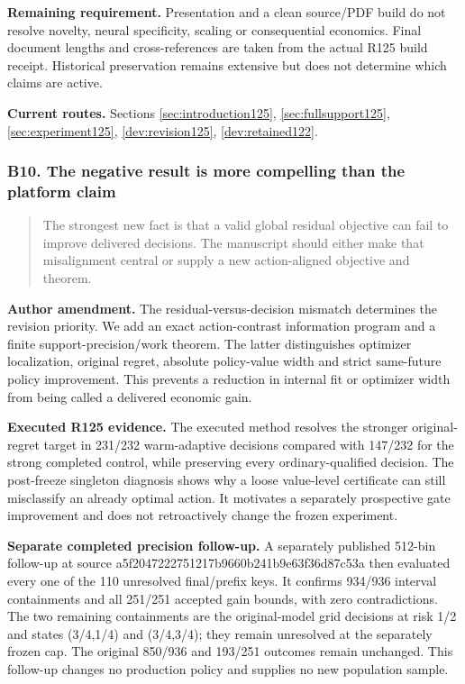\noindent\textbf{Remaining requirement.} Presentation and a clean source/PDF build do not resolve novelty, neural specificity, scaling or consequential economics. Final document lengths and cross-references are taken from the actual R125 build receipt. Historical preservation remains extensive but does not determine which claims are active.

\noindent\textbf{Current routes.} Sections \ref{sec:introduction125}, \ref{sec:fullsupport125}, \ref{sec:experiment125}, \ref{dev:revision125}, \ref{dev:retained122}.

\subsubsection{B10. The negative result is more compelling than the platform claim}

\begin{quote}\small
The strongest new fact is that a valid global residual objective can fail to improve delivered decisions. The manuscript should either make that misalignment central or supply a new action-aligned objective and theorem.
\end{quote}

\noindent\textbf{Author amendment.} The residual-versus-decision mismatch determines the revision priority. We add an exact action-contrast information program and a finite support-precision/work theorem. The latter distinguishes optimizer localization, original regret, absolute policy-value width and strict same-future policy improvement. This prevents a reduction in internal fit or optimizer width from being called a delivered economic gain.

\noindent\textbf{Executed R125 evidence.} The executed method resolves the stronger original-regret target in 231/232 warm-adaptive decisions compared with 147/232 for the strong completed control, while preserving every ordinary-qualified decision. The post-freeze singleton diagnosis shows why a loose value-level certificate can still misclassify an already optimal action. It motivates a separately prospective gate improvement and does not retroactively change the frozen experiment.

\noindent\textbf{Separate completed precision follow-up.} A separately published 512-bin follow-up at source a5f2047222751217b9660b241b9e63f36d87c53a then evaluated every one of the 110 unresolved final/prefix keys. It confirms 934/936 interval containments and all 251/251 accepted gain bounds, with zero contradictions. The two remaining containments are the original-model grid decisions at risk 1/2 and states (3/4,1/4) and (3/4,3/4); they remain unresolved at the separately frozen cap. The original 850/936 and 193/251 outcomes remain unchanged. This follow-up changes no production policy and supplies no new population sample.

